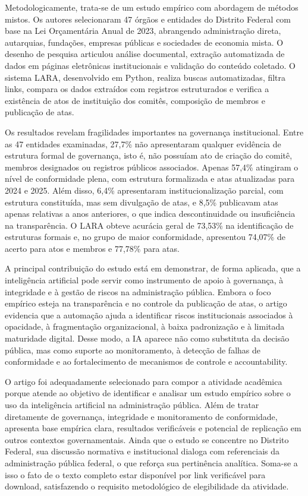 \documentclass[12pt,a4paper]{article}
\begin{document}
Metodologicamente, trata-se de um estudo empírico com abordagem de métodos mistos. Os autores selecionaram 47 órgãos e entidades do Distrito Federal com base na Lei Orçamentária Anual de 2023, abrangendo administração direta, autarquias, fundações, empresas públicas e sociedades de economia mista. O desenho de pesquisa articulou análise documental, extração automatizada de dados em páginas eletrônicas institucionais e validação do conteúdo coletado. O sistema LARA, desenvolvido em Python, realiza buscas automatizadas, filtra links, compara os dados extraídos com registros estruturados e verifica a existência de atos de instituição dos comitês, composição de membros e publicação de atas.

Os resultados revelam fragilidades importantes na governança institucional. Entre as 47 entidades examinadas, 27,7\% não apresentaram qualquer evidência de estrutura formal de governança, isto é, não possuíam ato de criação do comitê, membros designados ou registros públicos associados. Apenas 57,4\% atingiram o nível de conformidade plena, com estrutura formalizada e atas atualizadas para 2024 e 2025. Além disso, 6,4\% apresentaram institucionalização parcial, com estrutura constituída, mas sem divulgação de atas, e 8,5\% publicavam atas apenas relativas a anos anteriores, o que indica descontinuidade ou insuficiência na transparência. O LARA obteve acurácia geral de 73,53\% na identificação de estruturas formais e, no grupo de maior conformidade, apresentou 74,07\% de acerto para atos e membros e 77,78\% para atas.

A principal contribuição do estudo está em demonstrar, de forma aplicada, que a inteligência artificial pode servir como instrumento de apoio à governança, à integridade e à gestão de riscos na administração pública. Embora o foco empírico esteja na transparência e no controle da publicação de atas, o artigo evidencia que a automação ajuda a identificar riscos institucionais associados à opacidade, à fragmentação organizacional, à baixa padronização e à limitada maturidade digital. Desse modo, a IA aparece não como substituta da decisão pública, mas como suporte ao monitoramento, à detecção de falhas de conformidade e ao fortalecimento de mecanismos de controle e accountability.

O artigo foi adequadamente selecionado para compor a atividade acadêmica porque atende ao objetivo de identificar e analisar um estudo empírico sobre o uso da inteligência artificial na administração pública. Além de tratar diretamente de governança, integridade e monitoramento de conformidade, apresenta base empírica clara, resultados verificáveis e potencial de replicação em outros contextos governamentais. Ainda que o estudo se concentre no Distrito Federal, sua discussão normativa e institucional dialoga com referenciais da administração pública federal, o que reforça sua pertinência analítica. Soma-se a isso o fato de o texto completo estar disponível por link verificável para download, satisfazendo o requisito metodológico de elegibilidade da atividade.

\printbibliography
\end{document}

